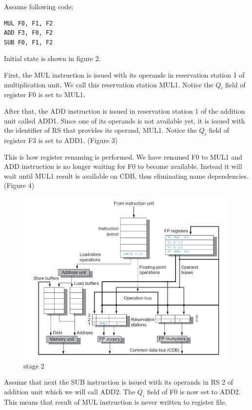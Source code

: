 \documentclass[12pt]{article}
\begin{document}
Assume following code:

\begin{lstlisting}[style=CStyle]
MUL F0, F1, F2
ADD F3, F0, F2
SUB F0, F1, F2
\end{lstlisting}


Initial state is shown in figure 2.

First, the MUL instruction is issued with its operands in reservation station 1 of multiplication unit. We call this reservation station MUL1. Notice the $Q_i$ field of register F0 is set to MUL1.

After that, the ADD instruction is issued in reservation station 1 of the addition unit called ADD1. Since one of its operands is not available yet, it is issued with the identifier of RS that provides its operand, MUL1. Notice the $Q_i$ field of register F3 is set to ADD1. (Figure 3)

This is how register renaming is performed. We have renamed F0 to MUL1 and ADD instruction is no longer waiting for F0 to become available. Instead it will wait until MUL1 result is available on CDB, thus eliminating name dependencies. (Figure 4)

\begin{figure}[H]
	\centering
	\includegraphics[width=1\textwidth]{./images/tomas/e2.png}	
	\cprotect\caption{stage 2}
\end{figure}


Assume that next the SUB instruction is issued with its operands in RS 2 of addition unit which we will call ADD2. The $Q_i$ field of F0 is now set to ADD2. This means that result of MUL instruction is never written to register file.
\end{document}
